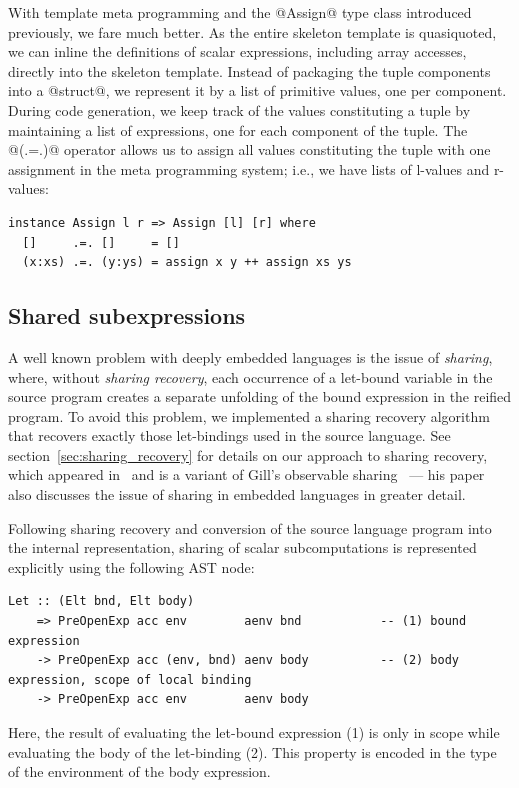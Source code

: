 With template meta programming and the @Assign@ type class introduced
previously, we fare much better. As the entire skeleton template is quasiquoted,
we can inline the definitions of scalar expressions, including array accesses,
directly into the skeleton template. Instead of packaging the tuple components
into a @struct@, we represent it by a list of primitive values, one per
component. During code generation, we keep track of the values constituting a
tuple by maintaining a list of expressions, one for each component of the tuple.
The @(.=.)@ operator allows us to assign all values constituting the tuple
with one assignment in the meta programming system; i.e., we have lists of
l-values and r-values:
%
\begin{lstlisting}[style=haskell]
instance Assign l r => Assign [l] [r] where
  []     .=. []     = []
  (x:xs) .=. (y:ys) = assign x y ++ assign xs ys
\end{lstlisting}


\subsection{Shared subexpressions}
\label{sec:shared_subexpressions}

A well known problem with deeply embedded languages is the issue of
\emph{sharing}, where, without \emph{sharing recovery}, each occurrence of
a let-bound variable in the source program creates a separate unfolding of the
bound expression in the reified program. To avoid this problem, we implemented a
sharing recovery algorithm that recovers exactly those let-bindings used in the
source language. See section~\ref{sec:sharing_recovery} for details on our
approach to sharing recovery, which appeared in~\cite{McDonell:2013wi} and is a
variant of Gill's observable sharing~\cite{Gill:2009dx} --- his paper also
discusses the issue of sharing in embedded languages in greater detail.

Following sharing recovery and conversion of the source language program into
the internal  representation, sharing of scalar
subcomputations is represented explicitly using the following AST node:
%
\begin{lstlisting}[style=haskell]
Let :: (Elt bnd, Elt body)
    => PreOpenExp acc env        aenv bnd           -- (1) bound expression
    -> PreOpenExp acc (env, bnd) aenv body          -- (2) body expression, scope of local binding
    -> PreOpenExp acc env        aenv body
\end{lstlisting}
%
Here, the result of evaluating the let-bound expression (1) is only in scope
while evaluating the body of the let-binding (2). This property is encoded in
the type of the environment of the body expression.

